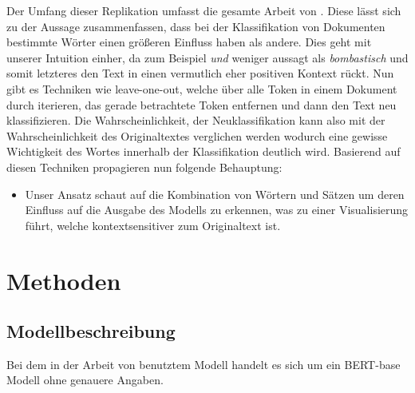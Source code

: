 \documentclass[DIV=13,fontsize=11pt]{scrartcl}
\begin{document}


Der Umfang dieser Replikation umfasst die gesamte Arbeit von \citeauthor{dunn2021context}. Diese lässt sich zu der Aussage zusammenfassen,
dass bei der Klassifikation von Dokumenten bestimmte Wörter einen größeren Einfluss haben als andere. Dies geht mit unserer
Intuition einher, da zum Beispiel \textit{und} weniger aussagt als \textit{bombastisch} und somit letzteres den Text in einen
vermutlich eher positiven Kontext rückt.
Nun gibt es Techniken wie leave-one-out, welche über alle Token in einem Dokument durch iterieren,
das gerade betrachtete Token entfernen und dann den Text neu klassifizieren. Die Wahrscheinlichkeit, der Neuklassifikation
kann also mit der Wahrscheinlichkeit des Originaltextes verglichen werden wodurch eine gewisse
Wichtigkeit des Wortes innerhalb der Klassifikation deutlich wird. Basierend auf diesen Techniken propagieren \citeauthor{dunn2021context} nun
folgende Behauptung:

\begin{itemize}
    \item \glqq Unser Ansatz schaut auf die Kombination von Wörtern und Sätzen um deren Einfluss auf die Ausgabe des Modells zu erkennen, was zu einer Visualisierung führt, welche kontextsensitiver zum Originaltext ist.\grqq \cite{dunn2021context}
\end{itemize}

\section{Methoden}

\subsection{Modellbeschreibung}
Bei dem in der Arbeit von \citeauthor{dunn2021context} benutztem Modell handelt es sich um ein BERT-base Modell ohne genauere Angaben.
\end{document}
